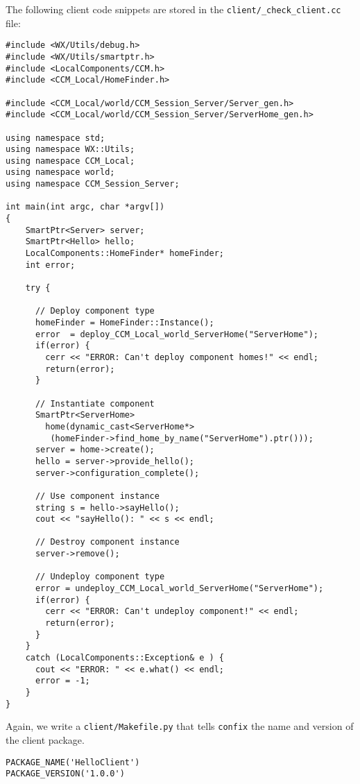 \noindent
The following client code snippets are stored in the 
{\tt client/\_check\_client.cc} file:
\begin{small}
\begin{verbatim}
#include <WX/Utils/debug.h>
#include <WX/Utils/smartptr.h>
#include <LocalComponents/CCM.h>
#include <CCM_Local/HomeFinder.h>

#include <CCM_Local/world/CCM_Session_Server/Server_gen.h>
#include <CCM_Local/world/CCM_Session_Server/ServerHome_gen.h>

using namespace std;
using namespace WX::Utils;
using namespace CCM_Local;
using namespace world;
using namespace CCM_Session_Server;

int main(int argc, char *argv[])
{
    SmartPtr<Server> server;
    SmartPtr<Hello> hello;
    LocalComponents::HomeFinder* homeFinder;
    int error;

    try {

      // Deploy component type 
      homeFinder = HomeFinder::Instance();
      error  = deploy_CCM_Local_world_ServerHome("ServerHome");
      if(error) {
        cerr << "ERROR: Can't deploy component homes!" << endl;
        return(error);
      }

      // Instantiate component 
      SmartPtr<ServerHome> 
        home(dynamic_cast<ServerHome*>
         (homeFinder->find_home_by_name("ServerHome").ptr()));
      server = home->create();   
      hello = server->provide_hello();
      server->configuration_complete();

      // Use component instance 
      string s = hello->sayHello();
      cout << "sayHello(): " << s << endl;

      // Destroy component instance 
      server->remove();

      // Undeploy component type 
      error = undeploy_CCM_Local_world_ServerHome("ServerHome");
      if(error) {
        cerr << "ERROR: Can't undeploy component!" << endl;
        return(error);
      }
    } 
    catch (LocalComponents::Exception& e ) {
      cout << "ERROR: " << e.what() << endl;
      error = -1;
    } 
}
\end{verbatim}
\end{small}


\noindent
Again, we write a {\tt client/Makefile.py} that tells {\tt confix} the
name and version of the client package.
\begin{small}
\begin{verbatim}
PACKAGE_NAME('HelloClient')
PACKAGE_VERSION('1.0.0')
\end{verbatim}
\end{small}

